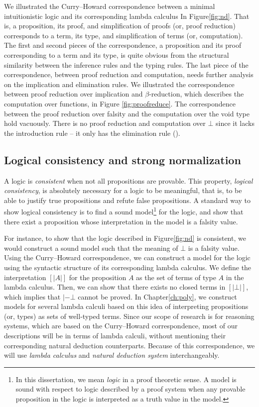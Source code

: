 We illustrated the Curry--Howard correspondence between
a minimal intuitionistic logic and its corresponding lambda calculus
In Figure\;\ref{fig:nd}. That is, a proposition, its proof, and
simplification of proofs (or, proof reduction) corresponds to
a term, its type, and simplification of terms (or, computation).
The first and second pieces of the correspondence, a proposition and
its proof corresponding to a term and its type, is quite obvious from
the structural similarity between the inference rules and the typing rules.
The last piece of the correspondence, between proof reduction and computation,
needs further analysis on the implication and elimination rules.
We illustrated the correspondence between proof reduction over implication
and $\beta$-reduction, which describes the computation over functions,
in Figure \ref{fig:proofreduce}. The correspondence between
the proof reduction over falsity and the computation over the void type
hold vacuously. There is no proof reduction and computation over $\bot$
since it lacks the introduction rule -- it only has the elimination rule
().

\subsection{Logical consistency and strong normalization}
A logic is \emph{consistent} when not all propositions are provable.
This property, \emph{logical consistency}, is absolutely necessary for
a logic to be meaningful, that is, to be able to justify true propositions
and refute false propositions. A standard way to show logical consistency
is to find a sound model\footnote{In this dissertation, we mean \emph{logic}
        in a proof theoretic sense. A model is sound with respect to logic
        described by a proof system when any provable proposition
        in the logic is interpreted as a truth value in the model.}
for the logic, and show that there exist a proposition whose interpretation
in the model is a falsity value.

For instance, to show that the logic described in Figure\;\ref{fig:nd}
is consistent, we would construct a sound model such that the meaning of
$\bot$ is a falsity value. Using the Curry--Howard correspondence,
we can construct a model for the logic using the syntactic structure of its
corresponding lambda calculus. We define the interpretation $[|A|]$ for
the proposition $A$ as the set of terms of type $A$ in the lambda calculus.
Then, we can show that there exists no closed terms in $[|\bot|]$,
which implies that $|- \bot$ cannot be proved. In Chapter\;\ref{ch:poly},
we construct models for several lambda calculi based on this idea of
interpreting propositions (or, types) as sets of well-typed terms.
Since our scope of research is for reasoning systems, which are based on
the Curry--Howard correspondence, most of our descriptions will be in terms of
lambda calculi, without mentioning their corresponding natural deduction
counterparts. Because of this correspondence, we will use \emph{lambda calculus}
and \emph{natural deduction system} interchangeably.


